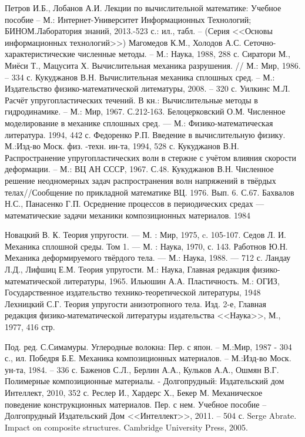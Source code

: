 \begin{thebibliography}{99}

Петров И.Б., Лобанов А.И. Лекции по вычислительной математике: Учебное пособие -- М.: Интернет-Университет Информационных Технологий; БИНОМ.Лаборатория знаний, 2013.-523 с.: ил., табл. -- (Серия <<Основы информационных технологий>>)
Магомедов К.М., Холодов А.С. Сеточно-характеристические численные методы. -- М.: Наука, 1988, 288 с.
Сиратори М., Миёси Т., Мацусита Х. Вычислительная механика разрушения. // М.: Мир, 1986. -- 334 с.
Кукуджанов В.Н. Вычислительная механика сплошных сред. -- М.: Издательство физико-математической литематуры, 2008. -- 320 с.
Уилкинс М.Л. Расчёт упругопластических течений. В кн.: Вычислительные методы в гидродинамике. -- М.: Мир, 1967. С.212-163.
Белоцерковский О.М. Численное моделирование в механике сплошных сред. — М.: Физико-математическая литература. 1994, 442 с.
Федоренко Р.П. Введение в вычислительную физику. М.:Изд-во Моск. физ. -техн. ин-та, 1994, 528 с.
Кукуджанов В.Н. Распространение упругопластических волн в стержне с учётом влияния скорости деформации. -- М.: ВЦ АН СССР, 1967. С.48.
Кукуджанов В.Н. Численное решение неодномерных задач распространения волн напряжений в твёрдых телах//Сообщение по прикладной математике ВЦ. 1976. Вып. 6. С.67.
Бахвалов Н.С., Панасенко Г.П. Осреднение процессов в периодических средах — математические задачи механики композиционных материалов. 1984

Новацкий В. К. Теория упругости. — М. : Мир, 1975, c. 105-107.
Седов Л. И. Механика сплошной среды. Том 1. — М. : Наука, 1970, с. 143.
Работнов Ю.Н. Механика деформируемого твёрдого тела. — М.: Наука, 1988. — 712 с.
Ландау Л.Д., Лифшиц Е.М. Теория упругости. М.: Наука, Главная редакция физико-математической литературы, 1965.
Ильюшин А.А. Пластичность. М.: ОГИЗ, Государственное издательство технико-теоретической литературы, 1948
Лехницкий С.Г. Теория упругости анизотропного тела. Изд. 2-е, Главная редакция физико-математической литературы издательства <<Наука>>, М., 1977, 416 стр.

Под. ред. С.Симамуры. Углеродные волокна: Пер. с япон. -- М.:Мир, 1987 - 304 с., ил.
Победря Б.Е. Механика композиционных материалов. -- М.:Изд-во Моск. ун-та, 1984. -- 336 с.
Баженов С.Л., Берлин А.А., Кульков А.А., Ошмян В.Г. Полимерные композиционные материалы. - Долгопрудный: Издательский дом Интеллект, 2010, 352 с.
Реслер И., Хардерс Х., Бекер М. Механическое поведение конструкционных материалов. Пер. с нем. Учебное пособие -- Долгопрудный Издательский Дом <<Интеллект>>, 2011. -- 504 с.
Serge Abrate. Impact on composite structures. Cambridge University Press, 2005. 


\end{thebibliography}
